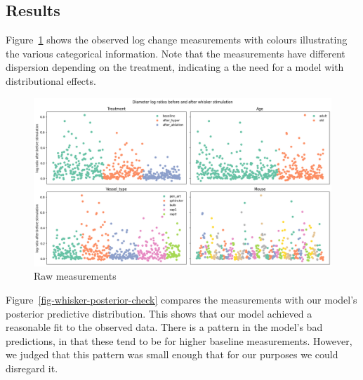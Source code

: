 \documentclass[
  letterpaper,
  DIV=11,
  numbers=noendperiod,
  oneside]{scrartcl}
\theoremstyle{plain}
\theoremstyle{remark}
\begin{document}
\subsection{Results}\label{results}

Figure~\ref{fig-whisker-measurements} shows the observed log change
measurements with colours illustrating the various categorical
information. Note that the measurements have different dispersion
depending on the treatment, indicating a the need for a model with
distributional effects.

\begin{figure}

\begin{minipage}{\linewidth}

\includegraphics{../plots/whisker-measurements-faceted.png}

\end{minipage}%

\caption{\label{fig-whisker-measurements}Raw measurements}

\end{figure}%

Figure~\ref{fig-whisker-posterior-check} compares the measurements with
our model's posterior predictive distribution. This shows that our model
achieved a reasonable fit to the observed data. There is a pattern in
the model's bad predictions, in that these tend to be for higher
baseline measurements. However, we judged that this pattern was small
enough that for our purposes we could disregard it.
\end{document}
